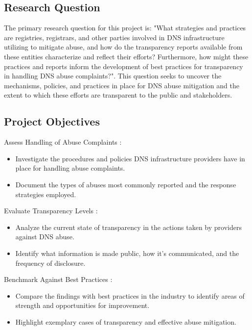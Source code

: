 \subsection{Research Question}

The primary research question for this project is: "What strategies and practices are registries, registrars, and other parties involved in DNS infrastructure utilizing to mitigate abuse, and how do the transparency reports available from these entities characterize and reflect their efforts? Furthermore, how might these practices and reports inform the development of best practices for transparency in handling DNS abuse complaints?". This question seeks to uncover the mechanisms, policies, and practices in place for DNS abuse mitigation and the extent to which these efforts are transparent to the public and stakeholders.

\subsection{Project Objectives}

Assess Handling of Abuse Complaints :

\begin{itemize}
  \item Investigate the procedures and policies DNS infrastructure providers have in place for handling abuse complaints.
  \item Document the types of abuses most commonly reported and the response strategies employed.
\end{itemize}

Evaluate Transparency Levels :

\begin{itemize}
  \item Analyze the current state of transparency in the actions taken by providers against DNS abuse.
  \item Identify what information is made public, how it's communicated, and the frequency of disclosure.
\end{itemize}

Benchmark Against Best Practices :

\begin{itemize}
  \item Compare the findings with best practices in the industry to identify areas of strength and opportunities for improvement.
  \item Highlight exemplary cases of transparency and effective abuse mitigation.
\end{itemize}

